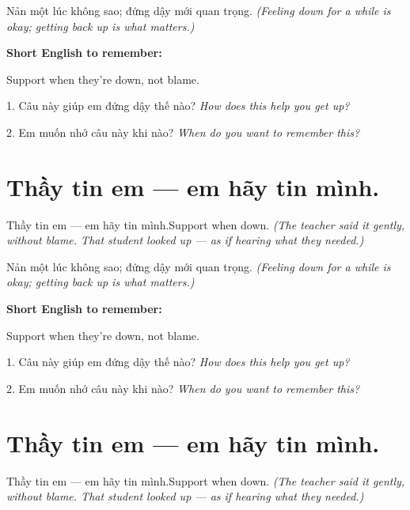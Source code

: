 \begin{baihoc}
Nản một lúc không sao; đứng dậy mới quan trọng.
\textit{(Feeling down for a while is okay; getting back up is what matters.)}
\end{baihoc}

\begin{ghinhoanh}
\textbf{Short English to remember:}

Support when they're down, not blame.

\end{ghinhoanh}

\begin{tuhocnhanh}
1. Câu này giúp em đứng dậy thế nào? \textit{How does this help you get up?}

2. Em muốn nhớ câu này khi nào? \textit{When do you want to remember this?}
\end{tuhocnhanh}
\ngancach


\section{Thầy tin em — em hãy tin mình.}
\begin{truyen}{Thầy tin em — em hãy tin mình.}{Support when down.}
\textit{(The teacher said it gently, without blame. That student looked up — as if hearing what they needed.)}
\end{truyen}

\begin{baihoc}
Nản một lúc không sao; đứng dậy mới quan trọng.
\textit{(Feeling down for a while is okay; getting back up is what matters.)}
\end{baihoc}

\begin{ghinhoanh}
\textbf{Short English to remember:}

Support when they're down, not blame.

\end{ghinhoanh}

\begin{tuhocnhanh}
1. Câu này giúp em đứng dậy thế nào? \textit{How does this help you get up?}

2. Em muốn nhớ câu này khi nào? \textit{When do you want to remember this?}
\end{tuhocnhanh}
\ngancach


\section{Thầy tin em — em hãy tin mình.}
\begin{truyen}{Thầy tin em — em hãy tin mình.}{Support when down.}
\textit{(The teacher said it gently, without blame. That student looked up — as if hearing what they needed.)}
\end{truyen}

